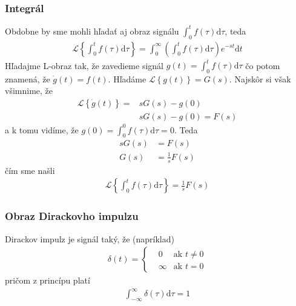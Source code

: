 \documentclass[a4paper, 10pt, ]{article}
\begin{document}
\subsubsection{Integrál}

Obdobne by sme mohli hľadať aj obraz signálu $\int_0^t f(\tau) \text{d}\tau$, teda
\begin{align}
    \mathcal L \left\{ \int_0^t f(\tau) \text{d}\tau \right\} = \int_0^\infty \left(\int_0^t f(\tau) \text{d}\tau \right) e^{-st}\text{d}t
\end{align}
Hľadajme L-obraz tak, že zavedieme signál $g(t) = \int_0^t f(\tau) \text{d}\tau$ čo potom znamená, že $\dot g(t) = f(t)$. Hľadáme $\mathcal L \left\{ g(t) \right\} = G(s)$. Najskôr si však všimnime, že
\begin{equation}
    \begin{aligned}
        \mathcal L \left\{ \dot g(t) \right\} =& s G(s) - g(0) \\
        & s G(s) - g(0) = F(s)
    \end{aligned}
\end{equation}
a k tomu vidíme, že $g(0) = \int_0^0 f(\tau) \text{d}\tau = 0$. Teda
\begin{subequations}
    \begin{align}
        sG(s) &= F(s) \\
        G(s) &= \frac{1}{s} F(s)
    \end{align}
\end{subequations}
čím sme našli
\begin{align}
    \mathcal L \left\{ \int_0^t f(\tau) \text{d}\tau \right\} = \frac{1}{s} F(s)
\end{align}



\subsubsection{Obraz Dirackovho impulzu}

Dirackov impulz je signál taký, že (napríklad)
\begin{align}
    \delta(t) =
    \left\{
        \begin{aligned}
            &0 & \text{ak $t \neq 0$} \\
            &\infty & \text{ak $t = 0$}
        \end{aligned}
    \right.
\end{align}
pričom z princípu platí
\begin{align}
    \int_{-\infty}^\infty \delta(\tau) \text{d}\tau = 1
\end{align}
\end{document}
